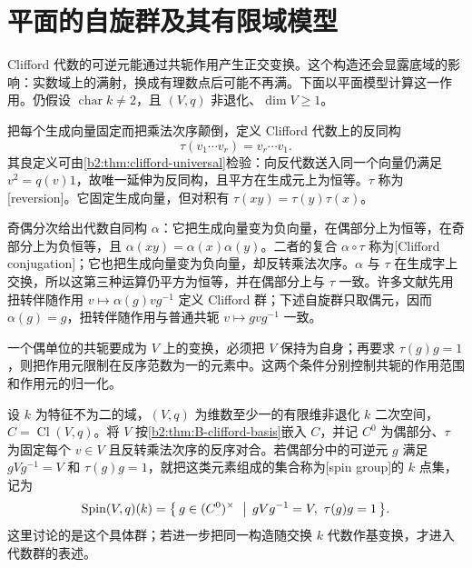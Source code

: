 
%
%

\section{平面的自旋群及其有限域模型}
\label{b2:sec:B04}

Clifford 代数的可逆元能通过共轭作用产生正交变换。这个构造还会显露底域的影响：实数域上的满射，换成有理数点后可能不再满。下面以平面模型计算这一作用。仍假设 \(\operatorname{char}k\ne2\)，且 \((V,q)\) 非退化、\(\dim V\ge1\)。

\ProseParagraphBreak
把每个生成向量固定而把乘法次序颠倒，定义 Clifford 代数上的反同构
\[
	\tau(v_1\cdots v_r)=v_r\cdots v_1.
\]
其良定义可由\cref{b2:thm:clifford-universal}检验：向反代数送入同一个向量仍满足 \(v^2=q(v)1\)，故唯一延伸为反同构，且平方在生成元上为恒等。\(\tau\) 称为[reversion]。它固定生成向量，但对积有 \(\tau(xy)=\tau(y)\tau(x)\)。

\ProseParagraphBreak
奇偶分次给出代数自同构 \(\alpha\)：它把生成向量变为负向量，在偶部分上为恒等，在奇部分上为负恒等，且 \(\alpha(xy)=\alpha(x)\alpha(y)\)。二者的复合 \(\alpha\circ\tau\) 称为[Clifford conjugation]；它也把生成向量变为负向量，却反转乘法次序。\(\alpha\) 与 \(\tau\) 在生成字上交换，所以这第三种运算仍平方为恒等，并在偶部分上与 \(\tau\) 一致。许多文献先用扭转伴随作用 \(v\mapsto\alpha(g)vg^{-1}\) 定义 Clifford 群；下述自旋群只取偶元，因而 \(\alpha(g)=g\)，扭转伴随作用与普通共轭 \(v\mapsto gvg^{-1}\) 一致。

\ProseParagraphBreak
一个偶单位的共轭要成为 \(V\) 上的变换，必须把 \(V\) 保持为自身；再要求 \(\tau(g)g=1\)，则把作用元限制在反序范数为一的元素中。这两个条件分别控制共轭的作用范围和作用元的归一化。

\begin{definition}\label{b2:def:B-spin-group}
	设 \(k\) 为特征不为二的域，\((V,q)\) 为维数至少一的有限维非退化 \(k\) 二次空间，\(C=\operatorname{Cl}(V,q)\)。将 \(V\) 按\cref{b2:thm:B-clifford-basis}嵌入 \(C\)，并记 \(C^0\) 为偶部分、\(\tau\) 为固定每个 \(v\in V\) 且反转乘法次序的反序对合。若偶部分中的可逆元 \(g\) 满足 \(gVg^{-1}=V\) 和 \(\tau(g)g=1\)，就把这类元素组成的集合称为[spin group]的 \(k\) 点集，记为
	\[
		\operatorname{Spin}(V,q)(k)= \bigl\{\,g\in(C^0)^\times\ \bigm|\, gVg^{-1}=V,\ \tau(g)g=1\,\bigr\}.
	\]
	这里讨论的是这个具体群；若进一步把同一构造随交换 \(k\) 代数作基变换，才进入代数群的表述。
\end{definition}

